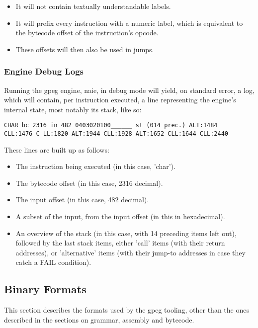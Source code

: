 \begin{itemize}
\item It will not contain textually understandable labels.
\item It will prefix every instruction with a numeric label, which is
      equivalent to the bytecode offset of the instruction's opcode.
\item These offsets will then also be used in jumps.
\end{itemize}

\subsubsection{Engine Debug Logs}

Running the gpeg engine, naie, in debug mode will yield, on standard error,
a log, which will contain, per instruction executed, a line representing
the engine's internal state, most notably its stack, like so:

\begin{myquote}
\begin{verbatim}
CHAR bc 2316 in 482 0403020100______ st (014 prec.) ALT:1484
CLL:1476 C LL:1820 ALT:1944 CLL:1928 ALT:1652 CLL:1644 CLL:2440
\end{verbatim}
\end{myquote}

These lines are built up as follows:

\begin{itemize}
\item The instruction being executed (in this case, 'char').
\item The bytecode offset (in this case, 2316 decimal).
\item The input offset (in this case, 482 decimal).
\item A subset of the input, from the input offset (in this in hexadecimal).
\item An overview of the stack (in this case, with 14 preceding items left
      out), followed by the last stack items, either 'call' items
      (with their return addresses), or 'alternative' items
      (with their jump-to addresses in case they catch a FAIL condition).
\end{itemize}

\subsection{Binary Formats}

This section describes the formats used by the gpeg tooling, other than
the ones described in the sections on grammar, assembly and bytecode.


